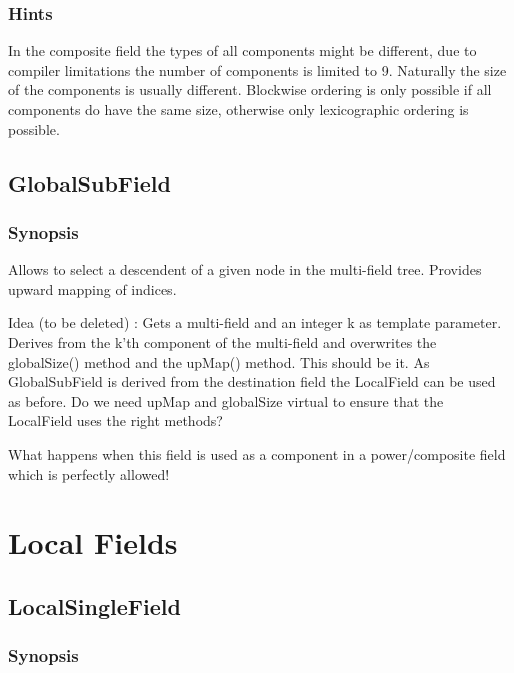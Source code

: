 \documentclass[11pt,a4paper,DIV11,%
notitlepage,oneside,abstracton,%
bibtotoc]{scrartcl}
\begin{document}
\subsubsection{Hints}

In the composite field the types of all components might be different,
due to compiler limitations the number of components is limited to
9. Naturally the size of the components is usually different. Blockwise
ordering is only possible if all components do have the same size,
otherwise only lexicographic ordering is possible.


\subsection{GlobalSubField}

\subsubsection{Synopsis}

Allows to select a descendent of a given node in the multi-field
tree. Provides upward mapping of indices.

Idea (to be deleted) : Gets a multi-field and an integer k as template
parameter. Derives from the k'th component of the multi-field and
overwrites the globalSize() method and the upMap() method. This should
be it. As GlobalSubField is derived from the destination field the
LocalField can be used as before. Do we need upMap and globalSize
virtual to ensure that the LocalField uses the right methods?

What happens when this field is used as a component in a
power/composite field which is perfectly allowed! 

\section{Local Fields}


\subsection{LocalSingleField}

\subsubsection{Synopsis}
\end{document}
